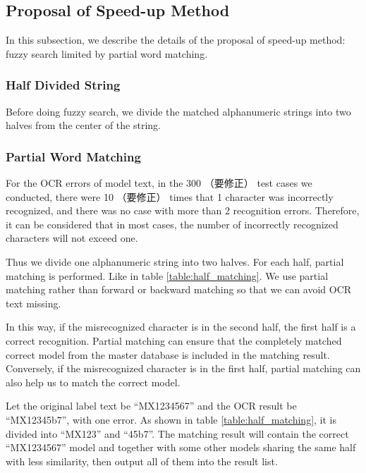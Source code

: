 \documentclass[technicalreport]{ieicej}
\begin{document}
    \subsection{Proposal of Speed-up Method}
        In this subsection, we describe the details of the proposal of speed-up method: fuzzy search limited by partial word matching.


        \subsubsection{Half Divided String}
            Before doing fuzzy search, we divide the matched alphanumeric strings into two halves from the center of the string.

        \subsubsection{Partial Word Matching}

            For the OCR errors of model text, in the 300 （要修正） test cases we conducted, there were 10 （要修正） times that 1 character was incorrectly recognized, and there was no case with more than 2 recognition errors. Therefore, it can be considered that in most cases, the number of incorrectly recognized characters will not exceed one.

            Thus we divide one alphanumeric string into two halves. For each half, partial matching is performed. Like in table \ref{table:half_matching}. We use partial matching rather than forward or backward matching so that we can avoid OCR text missing.

            In this way, if the misrecognized character is in the second half, the first half is a correct recognition. Partial matching can ensure that the completely matched correct model from the master database is included in the matching result. Conversely, if the misrecognized character is in the first half, partial matching can also help us to match the correct model.
            
            Let the original label text be “MX1234567” and the OCR result be “MX12345b7”, with one error. As shown in table \ref{table:half_matching}, it is divided into “MX123” and “45b7”. The matching result will contain the correct “MX1234567” model and together with some other models sharing the same half with less similarity, then output all of them into the result list.
\end{document}
